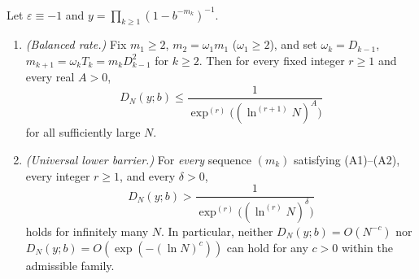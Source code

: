 \documentclass[11pt]{article}
\begin{document}
\begin{theorem}\label{thm:balanced-barrier}
Let $\varepsilon\equiv-1$ and $y=\prod_{k\ge1}(1-b^{-m_k})^{-1}$.
\begin{enumerate}[label=\textup{(\roman*)},nosep]
\item \emph{(Balanced rate.)} Fix $m_1\ge2$, $m_2=\omega_1m_1$ ($\omega_1\ge2$), and set $\omega_k=D_{k-1}$, $m_{k+1}=\omega_kT_k=m_kD_{k-1}^2$ for $k\ge2$. Then for every fixed integer $r\ge1$ and every real $A>0$,
\[
D_N(y;b)\le\frac1{\exp^{(r)}\bigl((\ln^{(r+1)}N)^A\bigr)}
\]
for all sufficiently large $N$.
\item \emph{(Universal lower barrier.)} For \emph{every} sequence $(m_k)$ satisfying \textup{(A1)}--\textup{(A2)}, every integer $r\ge1$, and every $\delta>0$,
\[
D_N(y;b)>\frac1{\exp^{(r)}\bigl((\ln^{(r)}N)^\delta\bigr)}
\]
holds for infinitely many $N$. In particular, neither $D_N(y;b)=O(N^{-c})$ nor $D_N(y;b)=O(\exp(-(\ln N)^c))$ can hold for any $c>0$ within the admissible family.
\end{enumerate}
\end{theorem}
\end{document}
